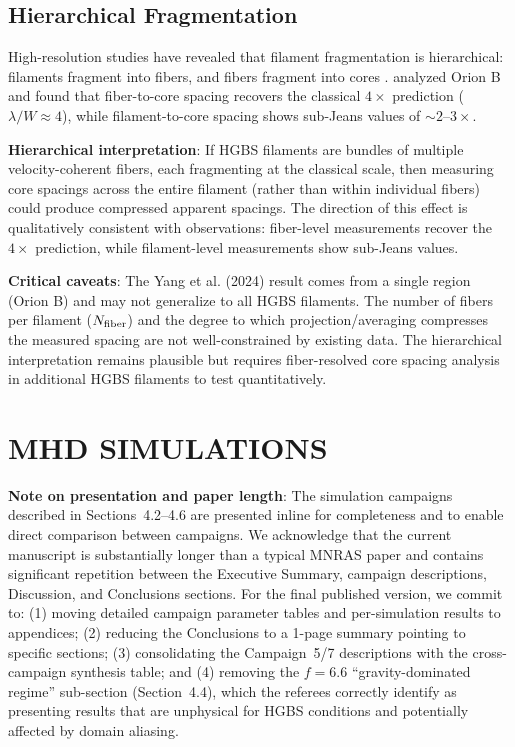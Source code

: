 \documentclass[twoside,twocolumn]{mnras}
\begin{document}
\subsection{Hierarchical Fragmentation}

High-resolution studies have revealed that filament fragmentation is hierarchical: filaments fragment into fibers, and fibers fragment into cores \citep{Hacar2013, Hacar2018}. \citet{Yang2024} analyzed Orion B and found that fiber-to-core spacing recovers the classical $4\times$ prediction ($\lambda/W \approx 4$), while filament-to-core spacing shows sub-Jeans values of $\sim2$--$3\times$.

\textbf{Hierarchical interpretation}: If HGBS filaments are bundles of multiple velocity-coherent fibers, each fragmenting at the classical scale, then measuring core spacings across the entire filament (rather than within individual fibers) could produce compressed apparent spacings. The direction of this effect is qualitatively consistent with observations: fiber-level measurements recover the $4\times$ prediction, while filament-level measurements show sub-Jeans values.

\textbf{Critical caveats}: The Yang et al. (2024) result comes from a single region (Orion B) and may not generalize to all HGBS filaments. The number of fibers per filament ($N_{\rm fiber}$) and the degree to which projection/averaging compresses the measured spacing are not well-constrained by existing data. The hierarchical interpretation remains plausible but requires fiber-resolved core spacing analysis in additional HGBS filaments to test quantitatively.

\section{MHD SIMULATIONS}

\textbf{Note on presentation and paper length}: The simulation campaigns described in Sections~4.2--4.6 are presented inline for completeness and to enable direct comparison between campaigns. We acknowledge that the current manuscript is substantially longer than a typical MNRAS paper and contains significant repetition between the Executive Summary, campaign descriptions, Discussion, and Conclusions sections. For the final published version, we commit to: (1) moving detailed campaign parameter tables and per-simulation results to appendices; (2) reducing the Conclusions to a 1-page summary pointing to specific sections; (3) consolidating the Campaign~5/7 descriptions with the cross-campaign synthesis table; and (4) removing the $f = 6.6$ ``gravity-dominated regime'' sub-section (Section~4.4), which the referees correctly identify as presenting results that are unphysical for HGBS conditions and potentially affected by domain aliasing.
\end{document}
